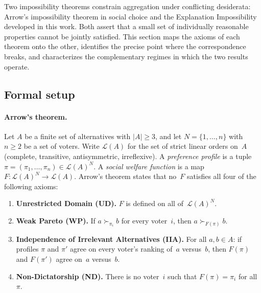 

Two impossibility theorems constrain aggregation under conflicting
desiderata: Arrow's impossibility theorem in social choice
\citep{arrow1951social} and the Explanation Impossibility
developed in this work. Both assert that a small set of individually
reasonable properties cannot be jointly satisfied. This section maps
the axioms of each theorem onto the other, identifies the precise point
where the correspondence breaks, and characterizes the complementary
regimes in which the two results operate.

\subsection{Formal setup}
\label{sec:arrow-setup}

\paragraph{Arrow's theorem.}
Let $A$ be a finite set of alternatives with $|A| \geq 3$, and let
$N = \{1, \ldots, n\}$ with $n \geq 2$ be a set of voters. Write
$\mathcal{L}(A)$ for the set of strict linear orders on~$A$ (complete,
transitive, antisymmetric, irreflexive). A \emph{preference profile}
is a tuple $\pi = (\pi_1, \ldots, \pi_n) \in \mathcal{L}(A)^N$.
A \emph{social welfare function} is a map
$F : \mathcal{L}(A)^N \to \mathcal{L}(A)$. Arrow's theorem states
that no~$F$ satisfies all four of the following axioms:
\begin{enumerate}[label=\textbf{A\arabic*.},leftmargin=2.5em]
  \item \textbf{Unrestricted Domain (UD).}\; $F$ is defined on all
    of~$\mathcal{L}(A)^N$.
  \item \textbf{Weak Pareto (WP).}\; If $a \succ_{\pi_i} b$ for every
    voter~$i$, then $a \succ_{F(\pi)} b$.
  \item \textbf{Independence of Irrelevant Alternatives (IIA).}\;
    For all $a, b \in A$: if profiles $\pi$ and $\pi'$ agree on every
    voter's ranking of~$a$ versus~$b$, then $F(\pi)$ and $F(\pi')$
    agree on~$a$ versus~$b$.
  \item \textbf{Non-Dictatorship (ND).}\; There is no voter~$i$ such
    that $F(\pi) = \pi_i$ for all~$\pi$.
\end{enumerate}

